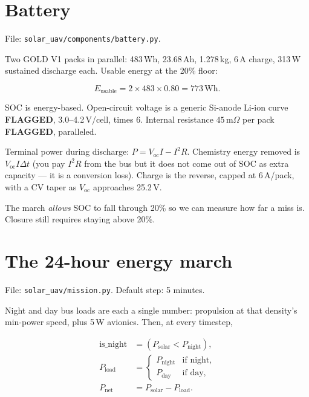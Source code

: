 \documentclass[11pt,letterpaper]{article}
\newcommand{\flag}{\textcolor{red!60!black}{\textbf{FLAGGED}}}
\newcommand{\code}[1]{\texttt{#1}}
\begin{document}
\section{Battery}

File: \code{solar\_uav/components/battery.py}.

Two GOLD V1 packs in parallel: 483\,Wh, 23.68\,Ah, 1.278\,kg, 6\,A charge, 313\,W sustained discharge each. Usable energy at the 20\% floor:

\begin{equation}
  E_\mathrm{usable} = 2 \times 483 \times 0.80 = 773\,\mathrm{Wh}.
\end{equation}

SOC is energy-based. Open-circuit voltage is a generic Si-anode Li-ion curve \flag{}, 3.0--4.2\,V/cell, times 6. Internal resistance $45\,\mathrm{m}\Omega$ per pack \flag{}, paralleled.

Terminal power during discharge: $P = V_\mathrm{oc} I - I^2 R$. Chemistry energy removed is $V_\mathrm{oc} I \Delta t$ (you pay $I^2R$ from the bus but it does not come out of SOC as extra capacity --- it is a conversion loss). Charge is the reverse, capped at 6\,A/pack, with a CV taper as $V_\mathrm{oc}$ approaches 25.2\,V.

The march \emph{allows} SOC to fall through 20\% so we can measure how far a miss is. Closure still requires staying above 20\%.

\section{The 24-hour energy march}

File: \code{solar\_uav/mission.py}. Default step: 5 minutes.

Night and day bus loads are each a single number: propulsion at that density's min-power speed, plus 5\,W avionics. Then, at every timestep,

\begin{align}
  \text{is\_night} &= (P_\mathrm{solar} < P_\mathrm{night}), \\
  P_\mathrm{load} &= \begin{cases}
      P_\mathrm{night} & \text{if night}, \\
      P_\mathrm{day} & \text{if day},
    \end{cases} \\
  P_\mathrm{net} &= P_\mathrm{solar} - P_\mathrm{load}.
\end{align}
\end{document}
